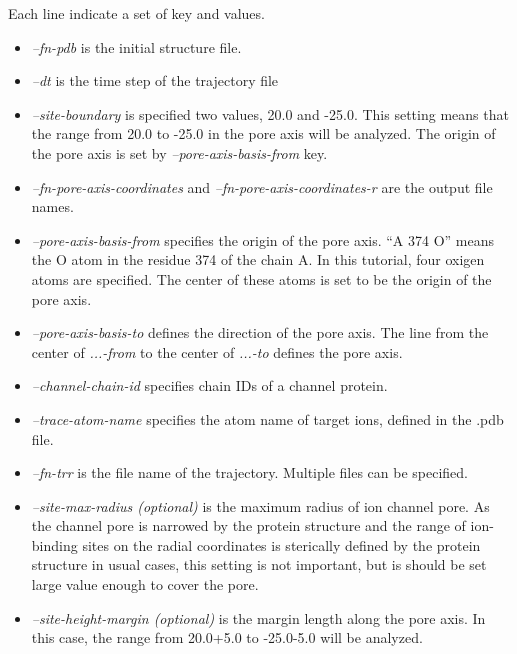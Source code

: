 \documentclass[letterpaper,10pt,english]{sphinxmanual}
\begin{document}
Each line indicate a set of key and values.
\begin{itemize}
\item {} 
\emph{--fn-pdb} is the initial structure file.

\item {} 
\emph{--dt} is the time step of the trajectory file

\item {} 
\emph{--site-boundary} is specified two values, 20.0 and -25.0. This setting means that the range from 20.0 to -25.0 in the pore axis will be analyzed. The origin of the pore axis is set by \emph{--pore-axis-basis-from} key.

\item {} 
\emph{--fn-pore-axis-coordinates} and \emph{--fn-pore-axis-coordinates-r} are the output file names.

\item {} 
\emph{--pore-axis-basis-from} specifies the origin of the pore axis. ``A 374 O'' means the O atom in the residue 374 of the chain A. In this tutorial, four oxigen atoms are specified. The center of these atoms is set to be the origin of the pore axis.

\item {} 
\emph{--pore-axis-basis-to} defines the direction of the pore axis. The line from the center of \emph{...-from} to the center of \emph{...-to} defines the pore axis.

\item {} 
\emph{--channel-chain-id} specifies chain IDs of a channel protein.

\item {} 
\emph{--trace-atom-name} specifies the atom name of target ions, defined in the .pdb file.

\item {} 
\emph{--fn-trr} is the file name of the trajectory. Multiple files can be specified.

\item {} 
\emph{--site-max-radius (optional)} is the maximum radius of ion channel pore. As the channel pore is narrowed by the protein structure and the range of ion-binding sites on the radial coordinates is sterically defined by the protein structure in usual cases, this setting is not important, but is should be set large value enough to cover the pore.

\item {} 
\emph{--site-height-margin (optional)} is the margin length along the pore axis. In this case, the range from 20.0+5.0 to -25.0-5.0 will be analyzed.

\end{itemize}
\end{document}
